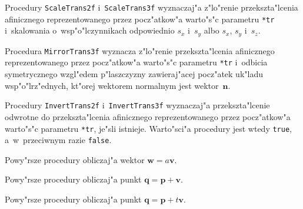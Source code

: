 \vspace{\bigskipamount}
Procedury \texttt{ScaleTrans2f} i~\texttt{ScaleTrans3f} wyznaczaj"a
z"lo"renie przekszta"lcenia afinicznego reprezentowanego przez pocz"atkow"a
warto"s"c parametru \texttt{*tr} i~skalowania o~wsp"o"lczynnikach
odpowiednio $s_x$ i~$s_y$ albo $s_x$, $s_y$ i~$s_z$.

\vspace{\bigskipamount}
Procedura \texttt{MirrorTrans3f} wyznacza z"lo"renie przekszta"lcenia
afinicznego reprezentowanego przez pocz"atkow"a warto"s"c parametru
\texttt{*tr} i~odbicia symetrycznego wzgl"edem p"laszczyzny zawieraj"acej
pocz"atek uk"ladu wsp"o"lrz"ednych, kt"orej wektorem normalnym jest
wektor~$\bm{n}$.

\vspace{\bigskipamount}
Procedury \texttt{InvertTrans2f} i~\texttt{InvertTrans3f} wyznaczaj"a
przekszta"lcenie odwrotne do przekszta"lcenia afinicznego reprezentowanego
przez pocz"atkow"a warto"s"c parametru \texttt{*tr}, je"sli istnieje.
Warto"sci"a procedury jest wtedy \texttt{true}, a~w~przeciwnym razie
\texttt{false}.

\vspace{\bigskipamount}
Powy"rsze procedury obliczaj"a wektor $\bm{w}=a\bm{v}$.

\vspace{\bigskipamount}
Powy"rsze procedury obliczaj"a punkt $\bm{q}=\bm{p}+\bm{v}$.

\vspace{\bigskipamount}
Powy"rsze procedury obliczaj"a punkt $\bm{q}=\bm{p}+t\bm{v}$.

